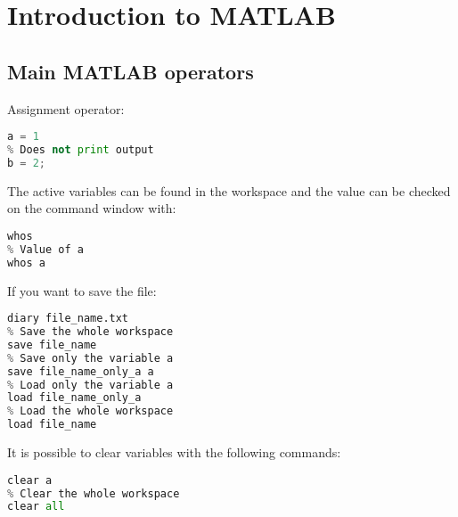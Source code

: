 \documentclass[12pt, a4paper]{report}
\newtheorem[style=M,bodystyle=\normalfont]{theorem}{Theorem}
\newtheorem[style=M,bodystyle=\normalfont]{corollary}{Corollary}
\newtheorem[style=M,bodystyle=\normalfont]{lemma}{Lemma}
\newtheorem[style=M,bodystyle=\normalfont]{definition}{Definition}
\begin{document}
\newpage

\tableofcontents

\newpage

\chapter{Introduction to MATLAB}
    \section{Main MATLAB operators}
    Assignment operator: 
    \begin{lstlisting}[language=Python]
% Print output
a = 1 
% Does not print output
b = 2;
    \end{lstlisting}
    The active variables can be found in the workspace and the value can be checked on the command window with: 
    \begin{lstlisting}[language=Python]
% Value of all variables
whos
% Value of a
whos a
    \end{lstlisting}
    If you want to save the file: 
    \begin{lstlisting}[language=Python]
% Save the command history
diary file_name.txt 
% Save the whole workspace
save file_name 
% Save only the variable a
save file_name_only_a a 
% Load only the variable a
load file_name_only_a 
% Load the whole workspace
load file_name 
    \end{lstlisting}
    It is possible to clear variables with the following commands: 
    \begin{lstlisting}[language=Python]
% Clear only the variable a
clear a 
% Clear the whole workspace
clear all 
    \end{lstlisting}
\end{document}
